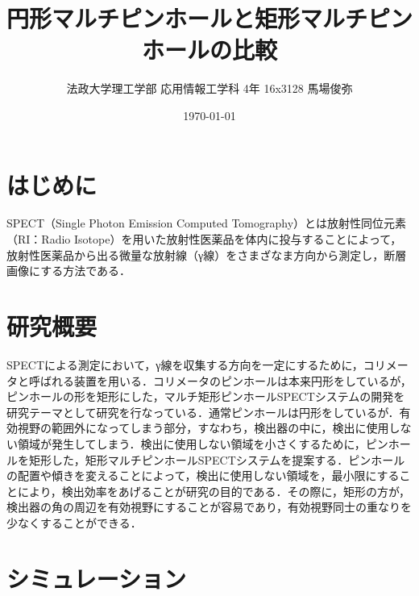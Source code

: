 \documentclass[dvipdfmx,autodetect-engine,twocolumn,10pt]{jsarticle}%
\title{円形マルチピンホールと矩形マルチピンホールの比較}
\author{法政大学理工学部 応用情報工学科 4年 16x3128 馬場俊弥}
\date{\today}
\begin{document}
\maketitle
\section{はじめに}
SPECT（Single Photon Emission Computed Tomography）とは放射性同位元素（RI：Radio Isotope）を用いた放射性医薬品を体内に投与することによって，放射性医薬品から出る微量な放射線（γ線）をさまざなま方向から測定し，断層画像にする方法である．


\section{研究概要}
SPECTによる測定において，γ線を収集する方向を一定にするために，コリメータと呼ばれる装置を用いる．コリメータのピンホールは本来円形をしているが，ピンホールの形を矩形にした，マルチ矩形ピンホールSPECTシステムの開発を研究テーマとして研究を行なっている．通常ピンホールは円形をしているが．有効視野の範囲外になってしまう部分，すなわち，検出器の中に，検出に使用しない領域が発生してしまう．検出に使用しない領域を小さくするために，ピンホールを矩形した，矩形マルチピンホールSPECTシステムを提案する．ピンホールの配置や傾きを変えることによって，検出に使用しない領域を，最小限にすることにより，検出効率をあげることが研究の目的である．その際に，矩形の方が，検出器の角の周辺を有効視野にすることが容易であり，有効視野同士の重なりを少なくすることができる．

\newpage
\section{シミュレーション}
\end{document}
